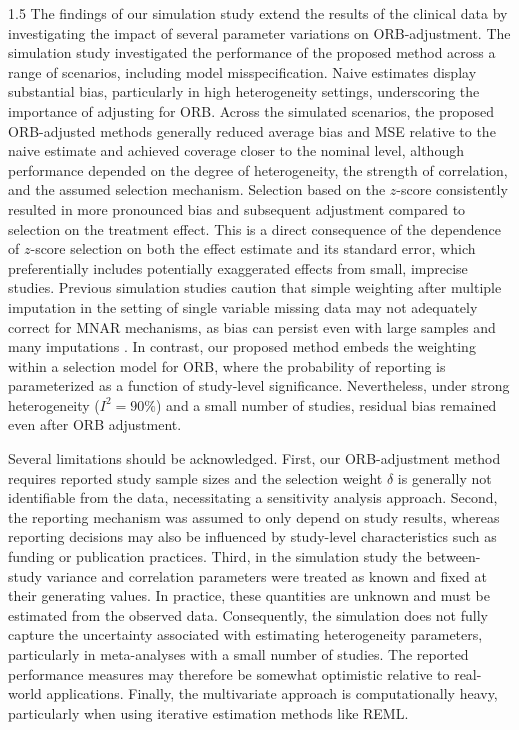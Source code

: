 \documentclass{article}
\begin{document}
\begin{spacing}{1.5}
The findings of our simulation study extend the results of the clinical data by investigating the impact of several parameter variations on ORB-adjustment. The simulation study investigated the performance of the proposed method across a range of scenarios, including model misspecification. Naive estimates display substantial bias, particularly in high heterogeneity settings, underscoring the importance of adjusting for ORB. Across the simulated scenarios, the proposed ORB-adjusted methods generally reduced average bias and MSE relative to the naive estimate and achieved coverage closer to the nominal level, although performance depended on the degree of heterogeneity, the strength of correlation, and the assumed selection mechanism. Selection based on the $z$-score  consistently resulted in more pronounced bias and subsequent adjustment compared to selection on the treatment effect. This is a direct consequence of the dependence of $z$-score selection on both the effect estimate and its standard error, which preferentially includes potentially exaggerated effects from small, imprecise studies. Previous simulation studies caution that simple weighting after multiple imputation in the setting of single variable missing data may not adequately correct for MNAR mechanisms, as bias can persist even with large samples and many imputations \cite{hayati2015evaluation, carpenter2007sensitivity}. In contrast, our proposed method embeds the weighting within a selection model for ORB, where the probability of reporting is parameterized as a function of study-level significance. Nevertheless, under strong heterogeneity ($I^2=90\%$) and a small number of studies, residual bias remained even after ORB adjustment.

Several limitations should be acknowledged. First, our ORB-adjustment method requires reported study sample sizes and the selection weight $\delta$ is generally not identifiable from the data, necessitating a sensitivity analysis approach. Second, the reporting mechanism was assumed to only depend on study results, whereas reporting decisions may also be influenced by study-level characteristics such as funding or publication practices. Third, in the simulation study the between-study variance and correlation parameters were treated as known and fixed at their generating values. In practice, these quantities are unknown and must be estimated from the observed data. Consequently, the simulation does not fully capture the uncertainty associated with estimating heterogeneity parameters, particularly in meta-analyses with a small number of studies. The reported performance measures may therefore be somewhat optimistic relative to real-world applications. Finally, the multivariate approach is computationally heavy, particularly when using iterative estimation methods like REML. 


\end{spacing}
\end{document}
